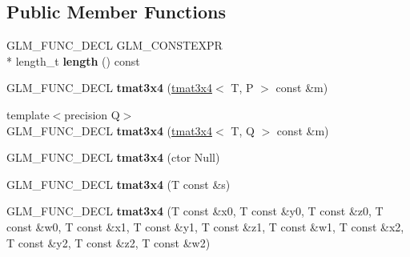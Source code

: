 \subsection*{Public Member Functions}
\begin{DoxyCompactItemize}
\item 
\hypertarget{structglm_1_1detail_1_1tmat3x4_ad1b616e9c9efe65cb81df719a3962ee1}{G\-L\-M\-\_\-\-F\-U\-N\-C\-\_\-\-D\-E\-C\-L G\-L\-M\-\_\-\-C\-O\-N\-S\-T\-E\-X\-P\-R \\*
length\-\_\-t {\bfseries length} () const }\label{structglm_1_1detail_1_1tmat3x4_ad1b616e9c9efe65cb81df719a3962ee1}

\item 
\hypertarget{structglm_1_1detail_1_1tmat3x4_ad712792f2a164d4ed2f84ee31226cacd}{G\-L\-M\-\_\-\-F\-U\-N\-C\-\_\-\-D\-E\-C\-L {\bfseries tmat3x4} (\hyperlink{structglm_1_1detail_1_1tmat3x4}{tmat3x4}$<$ T, P $>$ const \&m)}\label{structglm_1_1detail_1_1tmat3x4_ad712792f2a164d4ed2f84ee31226cacd}

\item 
\hypertarget{structglm_1_1detail_1_1tmat3x4_ab8b7d443036f14500e635408e42be95c}{{\footnotesize template$<$precision Q$>$ }\\G\-L\-M\-\_\-\-F\-U\-N\-C\-\_\-\-D\-E\-C\-L {\bfseries tmat3x4} (\hyperlink{structglm_1_1detail_1_1tmat3x4}{tmat3x4}$<$ T, Q $>$ const \&m)}\label{structglm_1_1detail_1_1tmat3x4_ab8b7d443036f14500e635408e42be95c}

\item 
\hypertarget{structglm_1_1detail_1_1tmat3x4_a32a8b66fd3ff5ea24c91aa476f2268c7}{G\-L\-M\-\_\-\-F\-U\-N\-C\-\_\-\-D\-E\-C\-L {\bfseries tmat3x4} (ctor Null)}\label{structglm_1_1detail_1_1tmat3x4_a32a8b66fd3ff5ea24c91aa476f2268c7}

\item 
\hypertarget{structglm_1_1detail_1_1tmat3x4_ad8bf1b12863045314b88499921fe1e61}{G\-L\-M\-\_\-\-F\-U\-N\-C\-\_\-\-D\-E\-C\-L {\bfseries tmat3x4} (T const \&s)}\label{structglm_1_1detail_1_1tmat3x4_ad8bf1b12863045314b88499921fe1e61}

\item 
\hypertarget{structglm_1_1detail_1_1tmat3x4_a81b6dd1cfa5b7835f6ae42fbd1565c37}{G\-L\-M\-\_\-\-F\-U\-N\-C\-\_\-\-D\-E\-C\-L {\bfseries tmat3x4} (T const \&x0, T const \&y0, T const \&z0, T const \&w0, T const \&x1, T const \&y1, T const \&z1, T const \&w1, T const \&x2, T const \&y2, T const \&z2, T const \&w2)}\label{structglm_1_1detail_1_1tmat3x4_a81b6dd1cfa5b7835f6ae42fbd1565c37}


\end{DoxyCompactItemize}
